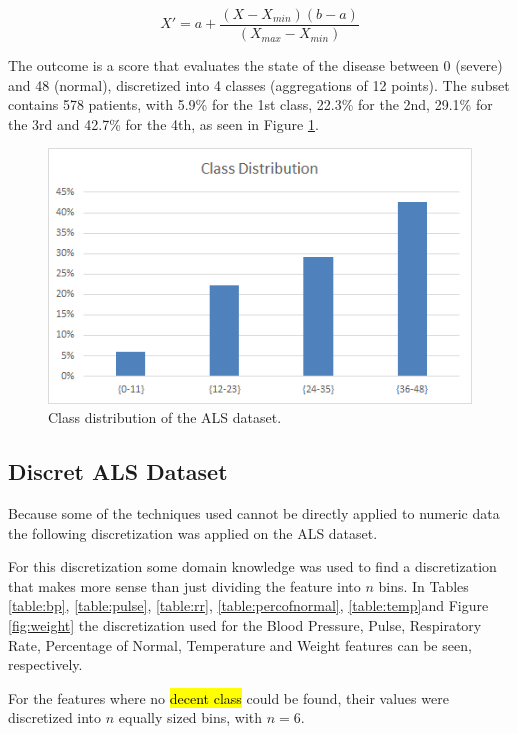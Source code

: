  \begin{equation}
 X'= a + \frac{(X-X_{min})(b-a)}{(X_{max} - X_{min})}
 \label{eq:featurescaling}
 \end{equation} 

The outcome is a score that evaluates the state of the disease between 0 (severe) and 48 (normal), discretized into 
4 classes (aggregations of 12 points). The subset contains 578 patients, with 5.9\% for the 1st class, 22.3\% for the 2nd,
 29.1\% for the 3rd and 42.7\% for the 4th, as seen in Figure \ref{fig:als_distribution}.
 
  \begin{figure}[h]
  	\centering
  	\includegraphics[width=0.49\linewidth]{Figures/class_distribution_als.png}
  	\caption{Class distribution of the ALS dataset.}
  	\label{fig:als_distribution}
  \end{figure}
  
\subsection{Discret ALS Dataset}
\label{subsection:discretals}

Because some of the techniques used cannot be directly applied to numeric data the following discretization was applied on the ALS dataset.

For this discretization some domain knowledge was used to find a discretization that makes more sense than just dividing the feature into $n$ bins. In Tables \ref{table:bp}, \ref{table:pulse}, \ref{table:rr}, \ref{table:percofnormal}, \ref{table:temp}and Figure \ref{fig:weight} the discretization used for the Blood Pressure, Pulse, Respiratory Rate, Percentage of Normal, Temperature and Weight features can be seen, respectively.

For the features where no \hl{decent class } could be found, their values were discretized into $n$ equally sized bins, with $n = 6$. 

